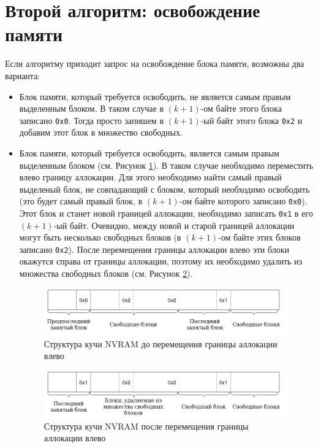 \documentclass[times,specification,annotation]{itmo-student-thesis}
\begin{document}
\section{Второй алгоритм: освобождение памяти}

Если алгоритму приходит запрос на освобождение блока памяти, возможны два варианта:

\begin{itemize}
    \item Блок памяти, который требуется освободить, не является самым правым выделенным блоком. В таком случае в $(k + 1)$-ом байте этого блока записано \texttt{0x0}. Тогда просто запишем в $(k + 1)$-ый байт этого блока \texttt{0x2} и добавим этот блок в множество свободных.
    
    \item Блок памяти, который требуется освободить, является самым правым выделенным блоком (см. Рисунок \ref{before-free-pic}). В таком случае необходимо переместить влево границу аллокации. Для этого необходимо найти самый правый выделеный блок, не совпадающий с блоком, который необходимо освободить (это будет самый правый блок, в $(k + 1)$-ом байте которого записано \texttt{0x0}). Этот блок и станет новой границей аллокации, необходимо записать \texttt{0x1} в его $(k + 1)$-ый байт. Очевидно, между новой и старой границей аллокации могут быть несколько свободных блоков (в $(k + 1)$-ом байте этих блоков записано \texttt{0x2}). После перемещения границы аллокации влево эти блоки окажутся справа от границы аллокации, поэтому их необходимо удалить из множества свободных блоков (см. Рисунок \ref{after-free-pic}).  
    
    \begin{figure}[H]
      \centering
      \caption{Структура кучи NVRAM до перемещения границы аллокации влево}
      \label{before-free-pic}
      \includegraphics[width=\linewidth]{before_free.png}
    \end{figure}
    
    \begin{figure}[H]
      \centering
      \caption{Структура кучи NVRAM после перемещения границы аллокации влево}
      \label{after-free-pic}
      \includegraphics[width=\linewidth]{after_free.png}
    \end{figure}
\end{itemize}
\end{document}
